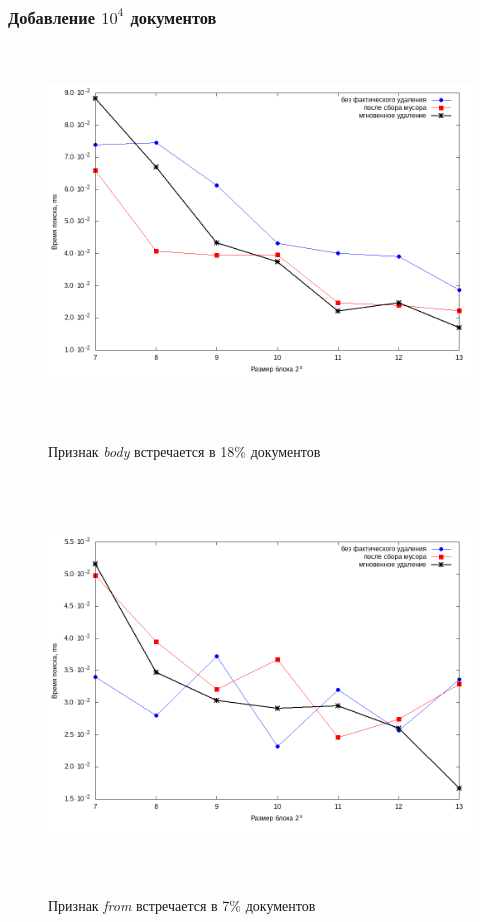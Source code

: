 \subsubsection{Добавление $10^4$ документов}

\begin{figure}[H]
\includegraphics[width=\linewidth, height=10cm]{fig/limit_1/1e4/body.png}
\caption{Признак \textit{body} встречается в 18\% документов}
\includegraphics[width=\linewidth, height=11cm]{fig/limit_1/1e4/from.png}
\caption{Признак \textit{from} встречается в 7\% документов}
\end{figure}

